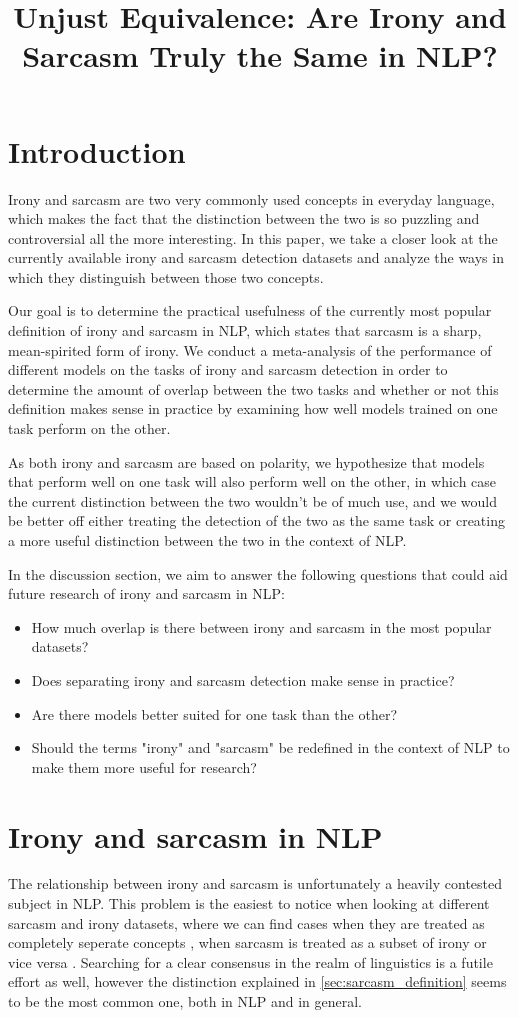 \documentclass[10pt, a4paper]{article}
\title{Unjust Equivalence: Are Irony and Sarcasm Truly the Same in NLP?}
\begin{document}
\maketitleabstract

\section{Introduction}

Irony and sarcasm are two very commonly used concepts in everyday language, which makes the fact that the distinction 
between the two is so puzzling and controversial all the more interesting. In this paper, we take a closer look at the
currently available irony and sarcasm detection datasets and analyze the ways in which they distinguish between those two
concepts.

Our goal is to determine the practical usefulness of the currently most popular definition of irony and sarcasm in NLP, which
states that sarcasm is a sharp, mean-spirited form of irony. We conduct a meta-analysis of the performance of different
models on the tasks of irony and sarcasm detection in order to determine the amount of overlap between the two tasks and
whether or not this definition makes sense in practice by examining how well models trained on one task perform on the other.

As both irony and sarcasm are based on polarity, we hypothesize that models that perform well on one task will also perform
well on the other, in which case the current distinction between the two wouldn't be of much use, and we would be better off
either treating the detection of the two as the same task or creating a more useful distinction between the two in the context
of NLP.

In the discussion section, we aim to answer the following questions that could aid future research of irony
and sarcasm in NLP:

\begin{itemize}
   \item How much overlap is there between irony and sarcasm in the most popular datasets?
   \item Does separating irony and sarcasm detection make sense in practice?
   \item Are there models better suited for one task than the other?
   \item Should the terms "irony" and "sarcasm" be redefined in the context of NLP to make them more useful for research?
\end{itemize}

\section{Irony and sarcasm in NLP}
The relationship between irony and sarcasm is unfortunately a heavily contested subject in NLP. This problem is the easiest
to notice when looking at different sarcasm and irony datasets, where we can find cases when they are treated as completely
seperate concepts \citep{kaggle-tweets}, when sarcasm is treated as a subset of irony \citep{semeval-2018} or vice
versa \citep{iSarcasm}. Searching for a clear consensus in the realm of linguistics is a futile effort as well, however the
distinction explained in \ref{sec:sarcasm_definition} seems to be the most common one, both in NLP and in general.
\end{document}
